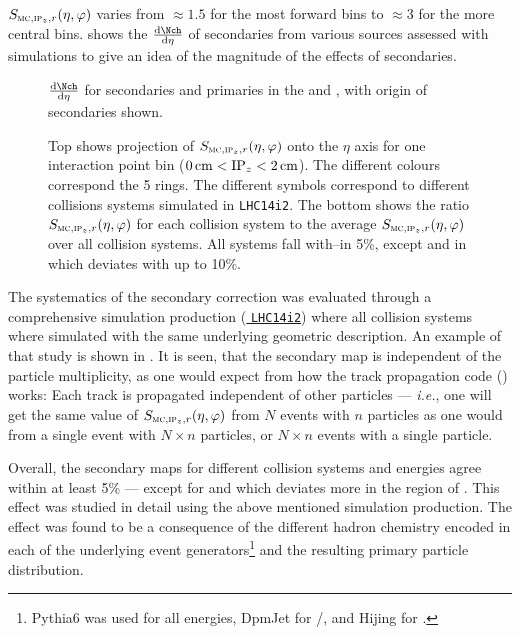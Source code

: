 $\SecMap$ varies from $\approx 1.5$ for the most forward bins to
$\approx 3$ for the more central bins. 
shows the $\dndeta$ of secondaries from various sources assessed with
simulations to give an idea of the magnitude of the effects of
secondaries.

\begin{figure}[htbp]
  \centering
  \caption{$\dndeta$ for secondaries and primaries in the \FMD{} and
    \SPD{}, with origin of secondaries shown.}
  \label{fig:secondaries:origin}
\end{figure} 

\begin{figure}[htbp]
  \centering
  \caption{Top shows projection of $\SecMap$ onto the $\eta$ axis for
    one interaction point bin ($\unit[0]{cm}<\IPz{}<\unit[2]{cm}$).
    The different colours correspond the 5 \FMD{} rings.  The
    different symbols correspond to different collisions systems
    simulated in \texttt{LHC14i2}.  The bottom shows the ratio
    $\SecMap$ for each collision system to the average $\SecMap$ over
    all collision systems. All systems fall with--in 5\%, except
    \PbpCol{} and \PbPbCol{} in  which deviates with up to
    10\%. }
  \label{fig:secmap:all}
\end{figure} 
 
The systematics of the secondary correction was evaluated through a
comprehensive simulation production
(\href{https://alimonitor.cern.ch/job_details.jsp?jt_field1=LHC14i2}{%
  \texttt{LHC14i2}}) where all collision systems where simulated with
the same underlying geometric description. An example of that study is
shown in .  It is seen, that the secondary map
is independent of the particle multiplicity, as one would expect from
how the track propagation code () works: Each track is
propagated independent of other particles --- \textit{i.e.}, one will
get the same value of $\SecMap$ from $N$ events with $n$ particles as
one would from a single event with $N\times n$ particles, or
$N\times n$ events with a single particle.

Overall, the secondary maps for different collision systems and
energies agree within at least 5\% --- except for \PbPbCol{} and
\PbpCol{} which deviates more in the region of .  This effect
was studied in detail using the above mentioned simulation
production.  The effect was found to be a consequence of the different
hadron chemistry encoded in each of the underlying event
generators\footnote{Pythia6 was used for all \ppCol{} energies, DpmJet
  for \pPbCol{}/\PbpCol{}, and Hijing for \PbPbCol{}.} and the
resulting primary particle distribution. 

